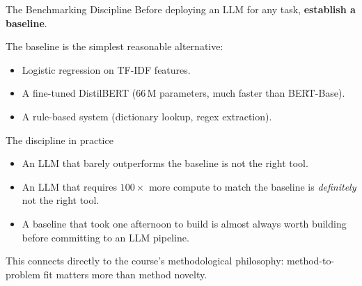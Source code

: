 \documentclass[11pt,aspectratio=169,professionalfonts]{beamer}
\begin{document}
\begin{frame}{The Benchmarking Discipline}
  Before deploying an LLM for any task,
  \textbf{establish a baseline}.

  The baseline is the simplest reasonable alternative:
  \begin{itemize}
    \item Logistic regression on TF-IDF features.
    \item A fine-tuned DistilBERT (66\,M parameters, much faster than BERT-Base).
    \item A rule-based system (dictionary lookup, regex extraction).
  \end{itemize}

  \begin{alertblock}{The discipline in practice}
    \begin{itemize}
      \item An LLM that barely outperforms the baseline is not the right tool.
      \item An LLM that requires $100\times$ more compute to match the
            baseline is \emph{definitely} not the right tool.
      \item A baseline that took one afternoon to build is almost always
            worth building before committing to an LLM pipeline.
    \end{itemize}
  \end{alertblock}

  This connects directly to the course's methodological philosophy:
  method-to-problem fit matters more than method novelty.
\end{frame}
%
%
\end{document}
